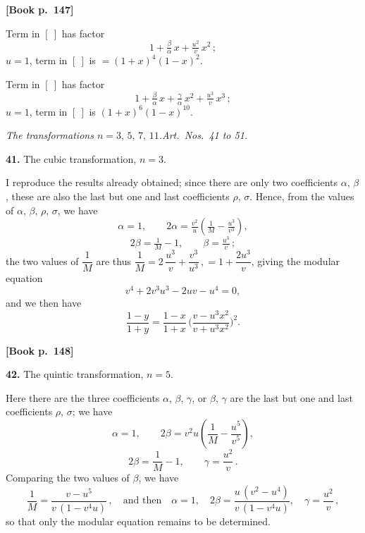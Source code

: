 \documentclass[11pt]{article}
\begin{document}
\noindent\textbf{[Book p.~147]}

\medskip

Term in $[\ ]$ has factor
\[
1 + \tfrac{\beta}{\alpha}\,x + \tfrac{u^2}{v}\,x^2\,;
\]
$u=1$, term in $[\ ]$ is $= (1+x)^4 (1-x)^2$.

\medskip

Term in $[\ ]$ has factor
\[
1 + \tfrac{\beta}{\alpha}\,x + \tfrac{\gamma}{\alpha}\,x^2 + \tfrac{u^3}{v}\,x^3\,;
\]
$u=1$, term in $[\ ]$ is $(1+x)^6(1-x)^{10}$.

\bigskip

\noindent\textit{The transformations $n = 3,\,5,\,7,\,11$.\quad Art.\ Nos.\ 41 to 51.}

\medskip

\textbf{41.} The cubic transformation, $n=3$.

I reproduce the results already obtained; since there are only two coefficients
$\alpha,\,\beta$, these are also the last but one and last coefficients $\rho,\,\sigma$.
Hence, from the values of $\alpha,\,\beta,\,\rho,\,\sigma$, we have
\[
\alpha = 1,\qquad 2\alpha = \tfrac{v^2}{u}\!\left(\tfrac{1}{M}-\tfrac{u^3}{v^3}\right),
\]
\[
2\beta = \tfrac{1}{M} - 1,\qquad \beta = \tfrac{u^3}{v}\,;
\]
the two values of $\dfrac{1}{M}$ are thus $\dfrac{1}{M}=2\,\dfrac{u^3}{v}+\dfrac{v^3}{u^3}\,, =1+\dfrac{2u^3}{v}$,
giving the modular equation
\[
v^4 + 2v^3 u^3 - 2uv - u^4 = 0,
\]
and we then have
\[
\frac{1-y}{1+y} = \frac{1-x}{1+x}\,\biggl(\frac{v-u^3 x^2}{v+u^3 x^2}\biggr)^{\!2}.
\]

\bigskip

\noindent\textbf{[Book p.~148]}

\medskip

\textbf{42.} The quintic transformation, $n=5$.

Here there are the three coefficients $\alpha,\,\beta,\,\gamma$, or $\beta,\,\gamma$
are the last but one and last coefficients $\rho,\,\sigma$; we have
\[
\alpha = 1,\qquad 2\beta = v^2 u\!\left(\frac{1}{M}-\frac{u^5}{v^5}\right),
\]
\[
2\beta = \frac{1}{M} - 1,\qquad \gamma = \frac{u^2}{v}\,.
\]
Comparing the two values of $\beta$, we have
\[
\frac{1}{M} = \frac{v - u^5}{v\,(1-v^4 u)}\,, \quad\text{and then}\quad
\alpha = 1,\quad 2\beta = \frac{u\,(v^2 - u^4)}{v\,(1-v^4 u)},\quad \gamma = \frac{u^2}{v}\,,
\]
so that only the modular equation remains to be determined.
\end{document}
